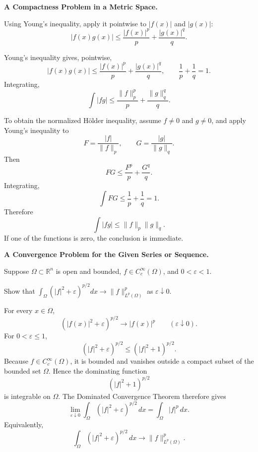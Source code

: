 \begin{problem}[CP-II-0512]
\label{prob:cp-ii-0512}
\textbf{A Compactness Problem in a Metric Space.}

\hspace*{1.5em}Using Young's inequality, apply it pointwise to
	$|f(x)|$ and $|g(x)|$:
	\[
	|f(x)g(x)|
	\le
	\frac{|f(x)|^p}{p} + \frac{|g(x)|^q}{q}.
	\]
\end{problem}

\begin{solution}
Young's inequality gives, pointwise,
\[
|f(x)g(x)|
\le
\frac{|f(x)|^p}{p}
+
\frac{|g(x)|^q}{q},
\qquad
\frac1p+\frac1q=1.
\]
Integrating,
\[
\boxed{
\int|fg|
\le
\frac{\|f\|_p^p}{p}
+
\frac{\|g\|_q^q}{q}.
}
\]

To obtain the normalized Hölder inequality, assume \(f\neq0\) and \(g\neq0\), and apply
Young's inequality to
\[
F=\frac{|f|}{\|f\|_p},
\qquad
G=\frac{|g|}{\|g\|_q}.
\]
Then
\[
FG
\le
\frac{F^p}{p}
+
\frac{G^q}{q}.
\]
Integrating,
\[
\int FG
\le
\frac1p+\frac1q
=
1.
\]
Therefore
\[
\boxed{
\int|fg|
\le
\|f\|_p\|g\|_q.
}
\]
If one of the functions is zero, the conclusion is immediate.
\end{solution}


\begin{problem}[CP-II-0513]
\label{prob:cp-ii-0513}
\textbf{A Convergence Problem for the Given Series or Sequence.}

\hspace*{1.5em}Suppose $\Omega\subset\mathbb R^n$ is open and bounded, $f\in C_c^\infty(\Omega)$, and $0<\varepsilon<1$.

  Show that $\displaystyle \int_\Omega (|f|^2+\varepsilon)^{p/2}dx \to \|f\|_{L^p(\Omega)}^p$ as $\varepsilon\downarrow0$.
\end{problem}

\begin{solution}
For every \(x\in\Omega\),
\[
(|f(x)|^2+\varepsilon)^{p/2}
\longrightarrow
|f(x)|^p
\qquad(\varepsilon\downarrow0).
\]
For \(0<\varepsilon\le1\),
\[
(|f|^2+\varepsilon)^{p/2}
\le
(|f|^2+1)^{p/2}.
\]
Because \(f\in C_c^\infty(\Omega)\), it is bounded and vanishes outside a compact
subset of the bounded set \(\Omega\). Hence the dominating function
\[
(|f|^2+1)^{p/2}
\]
is integrable on \(\Omega\). The Dominated Convergence Theorem therefore gives
\[
\lim_{\varepsilon\downarrow0}
\int_\Omega (|f|^2+\varepsilon)^{p/2}\,dx
=
\int_\Omega |f|^p\,dx.
\]
Equivalently,
\[
\boxed{
\int_\Omega (|f|^2+\varepsilon)^{p/2}\,dx
\longrightarrow
\|f\|_{L^p(\Omega)}^p.
}
\]
\end{solution}

